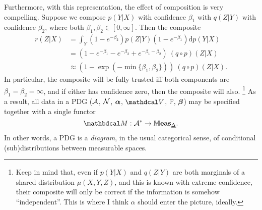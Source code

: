 Furthermore, with this representation, the effect of composition is very compelling.  Suppose we compose $p(Y|X)$ with confidence $\beta_1$ with $q(Z|Y)$ with confidence $\beta_2$, where both $\beta_1, \beta_2 \in [0,\infty]$.
Then the composite 
\begin{align*}
    r(Z|X) &= \int_Y   (1-e^{-\beta_2}) p(Z|Y) (1-e^{-\beta_1}) \mathrm d p(Y|X) \\
    &= (1-e^{-\beta_1} - e^{-\beta_2} + e^{-\beta_1-\beta_2})~(q \circ p)(Z|X) \\
    &\approx (1 - \exp(-\min\{ \beta_1, \beta_2\}))~(q \circ p)(Z|X).
\end{align*}
In particular, the composite will be fully trusted iff both components are $\beta_1 = \beta_2 = \infty$, and if either has confidence zero, then the composite will also. 
\unskip\footnote{Keep in mind that, even if $p(Y|X)$ and $q(Z|Y)$ are both marginals of a shared distribution $\mu(X,Y,Z)$, and this is known with extreme confidence, their composite will only be correct if the information is somehow ``independent''. 
This is where I think $\alpha$ should enter the picture, ideally.}
As a result, all data in a PDG ($\mathcal A$, $\mathcal N$, $\boldsymbol\alpha$, $\V$, $\mathbb P$, $\boldsymbol\beta$) may be specified together with a single functor 
\begin{equation}
    \dg M : \Ar^* \to \Meas_{\underline \Delta}.
\end{equation}
In other words, a PDG 
is a \emph{diagram}, in the usual categorical sense, of conditional (sub)distributions between measurable spaces. 


